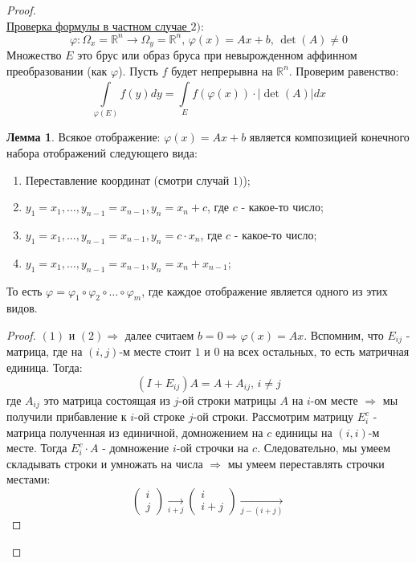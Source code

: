 \documentclass[12pt]{article}
\newcommand{\MR}{\mathbb{R}}
\theoremstyle{definition}
\newtheorem{lemma}{Лемма}
\newcommand{\ddint}[2]{\displaystyle\int\limits_{#1}^{#2}}
\begin{document}
\begin{proof}\hfill\\	
	\uline{Проверка формулы в частном случае $2)$}:	
	$$
		\varphi \colon \Omega_x = \MR^n \to \Omega_y =\MR^n, \, \varphi(x) = Ax + b, \, \det(A) \neq 0
	$$ 
	Множество $E$ это брус или образ бруса при невырожденном аффинном преобразовании (как $\varphi$). Пусть $f$ будет непрерывна на $\MR^n$. Проверим равенство:
	$$
		\ddint{\varphi(E)}{}f(y)dy = \ddint{E}{}f(\varphi(x)){\cdot}|\det{(A)}|dx
	$$
	
	\begin{lemma}
		Всякое отображение: $\varphi(x) = Ax + b$ является композицией конечного набора отображений следующего вида:\hfill
		\begin{enumerate}[label=(\arabic*)]
			\item Переставление координат (смотри случай $1)$);
			\item $y_1 = x_1, \dotsc , y_{n-1} = x_{n-1}, y_n = x_n + c$, где $c$ - какое-то число;
			\item $y_1 = x_1, \dotsc , y_{n-1} = x_{n-1}, y_n = c{\cdot}x_n$, где $c$ - какое-то число;
			\item $y_1 = x_1, \dotsc , y_{n-1} = x_{n-1}, y_n = x_n + x_{n-1}$;
		\end{enumerate}
		То есть $\varphi = \varphi_1 \circ \varphi_2 \circ \dotsc \circ \varphi_m$, где каждое отображение является одного из этих видов.
	\end{lemma}
	\begin{proof}
		$(1)$ и $(2) \Rightarrow$ далее считаем $b = 0 \Rightarrow \varphi(x) = Ax$. Вспомним, что $E_{ij}$ - матрица, где на $(i,j)$-м месте стоит $1$ и $0$ на всех остальных, то есть матричная единица. Тогда:
		$$
			(I + E_{ij})A = A + A_{ij}, \, i \neq j
		$$
		где $A_{ij}$ это матрица состоящая из $j$-ой строки матрицы $A$ на $i$-ом месте $\Rightarrow$ мы получили прибавление к $i$-ой строке $j$-ой строки. Рассмотрим матрицу $E_i^c$ - матрица полученная из единичной, домножением на $c$ единицы на $(i,i)$-м месте. Тогда $E_i^c{\cdot}A$ - домножение $i$-ой строчки на $c$. Следовательно, мы умеем складывать строки и умножать на числа $\Rightarrow$ мы умеем переставлять строчки местами:
		$$
			\begin{pmatrix}
				i\\
				j
			\end{pmatrix} \xrightarrow[ i + j]{}
			\begin{pmatrix}
				i \\
				i + j
			\end{pmatrix} \xrightarrow[ j - (i + j)]{}
$$
\end{proof}
\end{proof}
\end{document}
